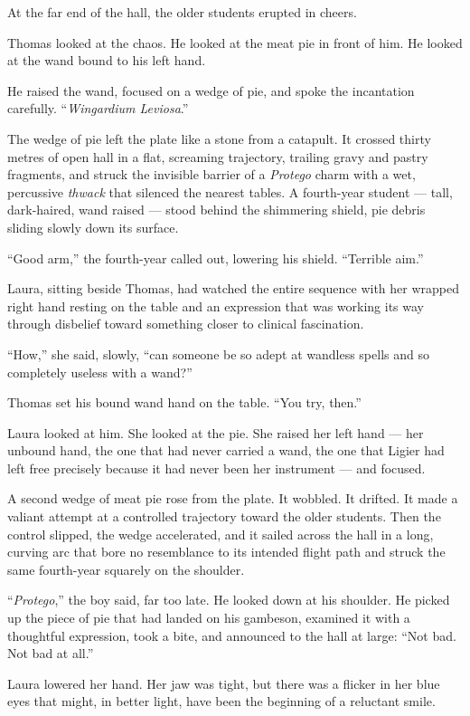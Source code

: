 At the far end of the hall, the older students erupted in cheers.
 
Thomas looked at the chaos. He looked at the meat pie in front of him. He looked at the wand bound to his left hand.
 
He raised the wand, focused on a wedge of pie, and spoke the incantation carefully. \enquote{\textit{Wingardium Leviosa}.}
 
The wedge of pie left the plate like a stone from a catapult. It crossed thirty metres of open hall in a flat, screaming trajectory, trailing gravy and pastry fragments, and struck the invisible barrier of a \textit{Protego} charm with a wet, percussive \textit{thwack} that silenced the nearest tables. A fourth-year student --- tall, dark-haired, wand raised --- stood behind the shimmering shield, pie debris sliding slowly down its surface.
 
\enquote{Good arm,} the fourth-year called out, lowering his shield. \enquote{Terrible aim.}
 
Laura, sitting beside Thomas, had watched the entire sequence with her wrapped right hand resting on the table and an expression that was working its way through disbelief toward something closer to clinical fascination.
 
\enquote{How,} she said, slowly, \enquote{can someone be so adept at wandless spells and so completely useless with a wand?}
 
Thomas set his bound wand hand on the table. \enquote{You try, then.}
 
Laura looked at him. She looked at the pie. She raised her left hand --- her unbound hand, the one that had never carried a wand, the one that Ligier had left free precisely because it had never been her instrument --- and focused.
 
A second wedge of meat pie rose from the plate. It wobbled. It drifted. It made a valiant attempt at a controlled trajectory toward the older students. Then the control slipped, the wedge accelerated, and it sailed across the hall in a long, curving arc that bore no resemblance to its intended flight path and struck the same fourth-year squarely on the shoulder.
 
\enquote{\textit{Protego},} the boy said, far too late. He looked down at his shoulder. He picked up the piece of pie that had landed on his gambeson, examined it with a thoughtful expression, took a bite, and announced to the hall at large: \enquote{Not bad. Not bad at all.}
 
Laura lowered her hand. Her jaw was tight, but there was a flicker in her blue eyes that might, in better light, have been the beginning of a reluctant smile.
 
